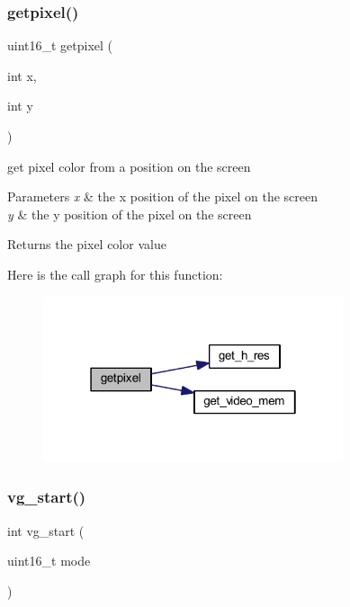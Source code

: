 \mbox{\label{group__video_ga07dd5e8b0cf0aa3aa860a89f4093045b}} 
\subsubsection{\texorpdfstring{getpixel()}{getpixel()}}
{\footnotesize\ttfamily uint16\+\_\+t getpixel (\begin{DoxyParamCaption}\item[{int}]{x,  }\item[{int}]{y }\end{DoxyParamCaption})}



get pixel color from a position on the screen 


\begin{DoxyParams}{Parameters}
{\em x} & the x position of the pixel on the screen \\
\hline
{\em y} & the y position of the pixel on the screen \\
\hline
\end{DoxyParams}
\begin{DoxyReturn}{Returns}
the pixel color value 
\end{DoxyReturn}
Here is the call graph for this function\+:
\nopagebreak
\begin{figure}[H]
\begin{center}
\leavevmode
\includegraphics[width=250pt]{group__video_ga07dd5e8b0cf0aa3aa860a89f4093045b_cgraph}
\end{center}
\end{figure}
\mbox{\label{group__video_gac67621adf87bcebb04fab536c7245315}} 
\subsubsection{\texorpdfstring{vg\_start()}{vg\_start()}}
{\footnotesize\ttfamily int vg\+\_\+start (\begin{DoxyParamCaption}\item[{uint16\+\_\+t}]{mode }\end{DoxyParamCaption})}



